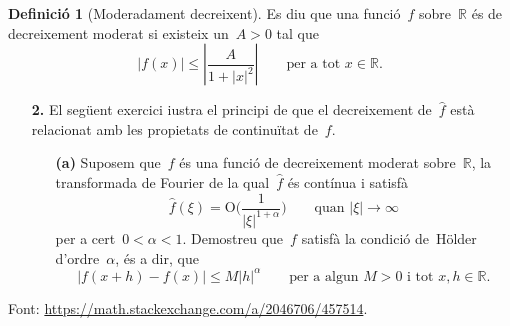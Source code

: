 \documentclass[a4paper]{article}
\theoremstyle{definition}
\newtheorem{definition}{Definició}
\newcommand{\abs}[1]{\lvert{#1}\rvert}
\newcommand{\Abs}[1]{\left\lvert{#1}\right\rvert}
\begin{document}
\begin{definition}[Moderadament decreixent]
    Es diu que una funció~\(f\) sobre~\(\mathbb{R}\) és de decreixement moderat
    si existeix un~\(A>0\) tal que
    \[
        \abs{f(x)} \leq \Abs{\frac{A}{1+\abs{x}^{2}}}
        \qquad\text{per a tot }x\in\mathbb{R}.
    \]
\end{definition}

\begin{enumerate}
    \item[\textbf{2.}] El següent exercici i{\lgem}ustra el principi de que el
        decreixement de~\(\widehat{f}\) està relacionat amb les propietats de
        continuïtat de~\(f\).
        \begin{enumerate}
            \item[\textbf{(a)}] Suposem que~\(f\) és una funció de decreixement
                moderat sobre~\(\mathbb{R}\), la transformada de Fourier de la
                qual~\(\widehat{f}\) és contínua i satisfà
                \[
                    \widehat{f}(\xi) =
                    \mathrm{O}\biggl(\frac{1}{\abs{\xi}^{1+\alpha}}\biggr)
                    \qquad\text{quan } \abs{\xi}\to\infty
                \]
                per a cert~\(0<\alpha<1\). Demostreu que~\(f\) satisfà la
                condició de~H\"older d'ordre~\(\alpha\), és a dir, que
                \[
                    \abs{f(x+h)-f(x)} \leq M\abs{h}^{\alpha}
                    \qquad
                    \text{per a algun } M>0 \text{ i tot } x,h\in\mathbb{R}.
                \]
        \end{enumerate}
\end{enumerate}
Font: \url{https://math.stackexchange.com/a/2046706/457514}.
\end{document}
